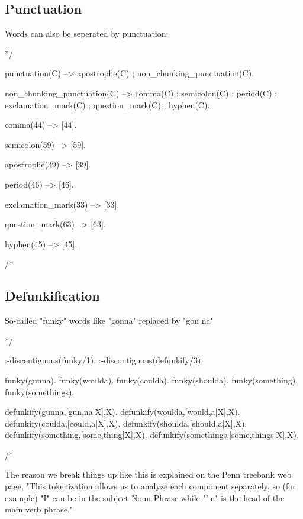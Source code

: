 \documentclass{book}[9pt]
\newenvironment{code}%
{\small \verbatim}%
{\endverbatim \large}
\begin{document}
\subsection{Punctuation}

Words can also be seperated by punctuation:

\begin{code}
*/

punctuation(C) -->
        apostrophe(C)
    ;
        non_chunking_punctuation(C).


non_chunking_punctuation(C) -->
        comma(C)
    ;
        semicolon(C)
    ;
        period(C)
    ;
        exclamation_mark(C)
    ;
        question_mark(C)
    ;
        hyphen(C).

comma(44) --> [44].

semicolon(59) --> [59].

apostrophe(39) --> [39].

period(46) --> [46].

exclamation_mark(33) --> [33].

question_mark(63) --> [63].

hyphen(45) --> [45].


/*
\end{code}

\subsection{Defunkification}

So-called "funky" words like "gonna" replaced by  "gon na"

\begin{code}
*/

:-discontiguous(funky/1).
:-discontiguous(defunkify/3).

funky(gunna).
funky(woulda).
funky(coulda).
funky(shoulda).
funky(something).
funky(somethings).

defunkify(gunna,[gun,na|X],X).
defunkify(woulda,[would,a|X],X).
defunkify(coulda,[could,a|X],X).
defunkify(shoulda,[should,a|X],X).
defunkify(something,[some,thing|X],X).
defunkify(somethings,[some,things|X],X).

/*      
\end{code}

\noindent The reason we break things up like this is explained on the Penn
treebank web page, "This tokenization allows us to analyze each component
separately, so (for example) "I" can be in the subject Noun Phrase while "'m"
is the head of the main verb phrase."
\end{document}
